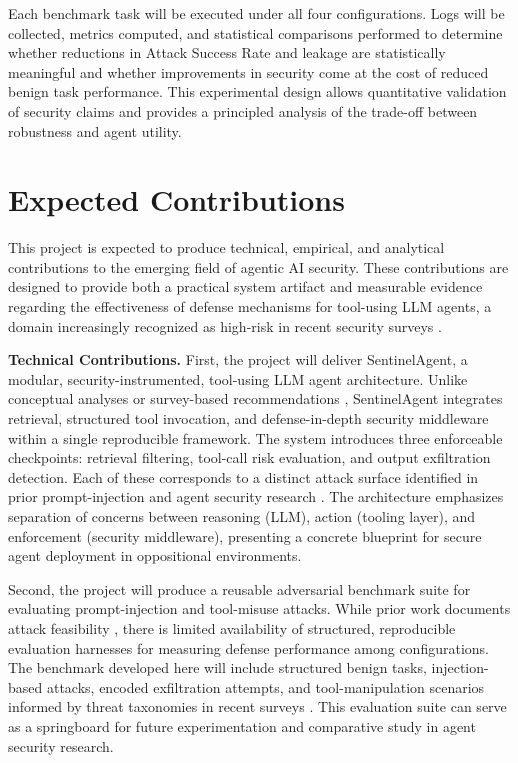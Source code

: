 \documentclass[11pt]{article}
\begin{document}
Each benchmark task will be executed under all four configurations. Logs will be collected, metrics computed, and statistical comparisons performed to determine whether reductions in Attack Success Rate and leakage are statistically meaningful and whether improvements in security come at the cost of reduced benign task performance. This experimental design allows quantitative validation of security claims and provides a principled analysis of the trade-off between robustness and agent utility.
\section{Expected Contributions}
This project is expected to produce technical, empirical, and analytical contributions to the emerging field of agentic AI security. These contributions are designed to provide both a practical system artifact and measurable evidence regarding the effectiveness of defense mechanisms for tool-using LLM agents, a domain increasingly recognized as high-risk in recent security surveys \cite{deng2025agentsurvey, chhabra2026agenticsecurity}.

\textbf{Technical Contributions.}
First, the project will deliver SentinelAgent, a modular, security-instrumented, tool-using LLM agent architecture. Unlike conceptual analyses or survey-based recommendations \cite{deng2025agentsurvey, schroeder2025multiagent}, SentinelAgent integrates retrieval, structured tool invocation, and defense-in-depth security middleware within a single reproducible framework. The system introduces three enforceable checkpoints: retrieval filtering, tool-call risk evaluation, and output exfiltration detection. Each of these corresponds to a distinct attack surface identified in prior prompt-injection and agent security research \cite{greshake2023prompt, chhabra2026agenticsecurity}. The architecture emphasizes separation of concerns between reasoning (LLM), action (tooling layer), and enforcement (security middleware), presenting a concrete blueprint for secure agent deployment in oppositional environments.

Second, the project will produce a reusable adversarial benchmark suite for evaluating prompt-injection and tool-misuse attacks. While prior work documents attack feasibility \cite{greshake2023prompt}, there is limited availability of structured, reproducible evaluation harnesses for measuring defense performance among configurations. The benchmark developed here will include structured benign tasks, injection-based attacks, encoded exfiltration attempts, and tool-manipulation scenarios informed by threat taxonomies in recent surveys \cite{deng2025agentsurvey, chhabra2026agenticsecurity}. This evaluation suite can serve as a springboard for future experimentation and comparative study in agent security research.
\end{document}
